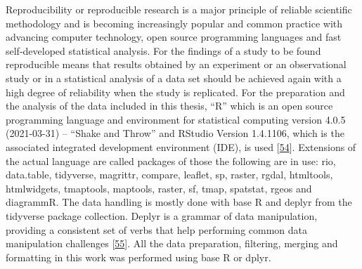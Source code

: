 \documentclass[a4paper,11pt]{article}
\begin{document}
Reproducibility or reproducible research is a major principle of reliable scientific methodology and is becoming increasingly popular and common practice with advancing computer technology, open source programming languages and fast self-developed statistical analysis. For the findings of a study to be found reproducible means that results obtained by an experiment or an observational study or in a statistical analysis of a data set should be achieved again with a high degree of reliability when the study is replicated. For the preparation and the analysis of the data included in this thesis, ``R'' which is an open source programming language and environment for statistical computing version 4.0.5 (2021-03-31) -- ``Shake and Throw'' and RStudio Version 1.4.1106, which is the associated integrated development environment (IDE), is used {[}\protect\hyperlink{ref-R}{54}{]}. Extensions of the actual language are called packages of those the following are in use: rio, data.table, tidyverse, magrittr, compare, leaflet, sp, raster, rgdal, htmltools, htmlwidgets, tmaptools, maptools, raster, sf, tmap, spatstat, rgeos and diagrammR. The data handling is mostly done with base R and deplyr from the tidyverse package collection. Deplyr is a grammar of data manipulation, providing a consistent set of verbs that help performing common data manipulation challenges {[}\protect\hyperlink{ref-HadleyWickham.2021}{55}{]}. All the data preparation, filtering, merging and formatting in this work was performed using base R or dplyr.
\end{document}
